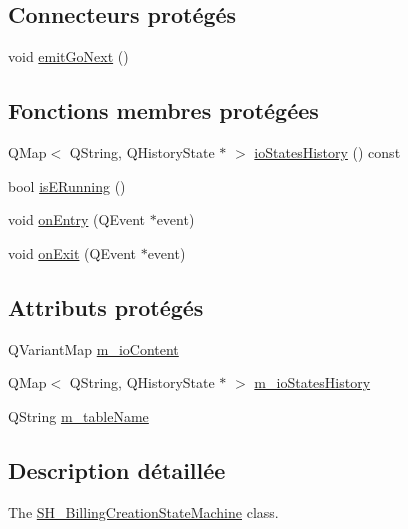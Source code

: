 \subsection*{Connecteurs protégés}
\begin{DoxyCompactItemize}
\item 
void \hyperlink{classSimpleHotel_1_1SH__GenericStateMachine_a37846ee6a4cb4d73cf2aff51cb025615}{emit\-Go\-Next} ()
\end{DoxyCompactItemize}
\subsection*{Fonctions membres protégées}
\begin{DoxyCompactItemize}
\item 
Q\-Map$<$ Q\-String, Q\-History\-State $\ast$ $>$ \hyperlink{classSimpleHotel_1_1SH__InOutStateMachine_a0f59a90204a7cbb6835da28cd234978f}{io\-States\-History} () const 
\item 
bool \hyperlink{classSimpleHotel_1_1SH__InOutStateMachine_a6ca4ef874eaaf2446c1a65e6bcbfc46b}{is\-E\-Running} ()
\item 
void \hyperlink{classSimpleHotel_1_1SH__GenericStateMachine_a42c47602883a70ef4965cff373cd5ab6}{on\-Entry} (Q\-Event $\ast$event)
\item 
void \hyperlink{classSimpleHotel_1_1SH__GenericStateMachine_adecc9814338e400f9fce1cc637f1e081}{on\-Exit} (Q\-Event $\ast$event)
\end{DoxyCompactItemize}
\subsection*{Attributs protégés}
\begin{DoxyCompactItemize}
\item 
Q\-Variant\-Map \hyperlink{classSimpleHotel_1_1SH__InOutStateMachine_a4b0a3a48b0da31fddb724a357ad9b52c}{m\-\_\-io\-Content}
\item 
Q\-Map$<$ Q\-String, Q\-History\-State $\ast$ $>$ \hyperlink{classSimpleHotel_1_1SH__InOutStateMachine_a45a7defb15e50a196bc471017fc86eb4}{m\-\_\-io\-States\-History}
\item 
Q\-String \hyperlink{classSimpleHotel_1_1SH__InOutStateMachine_a15c063debdaa4c87bd4925867a13ce9e}{m\-\_\-table\-Name}
\end{DoxyCompactItemize}


\subsection{Description détaillée}
The \hyperlink{classSimpleHotel_1_1SH__BillingCreationStateMachine}{S\-H\-\_\-\-Billing\-Creation\-State\-Machine} class. 

